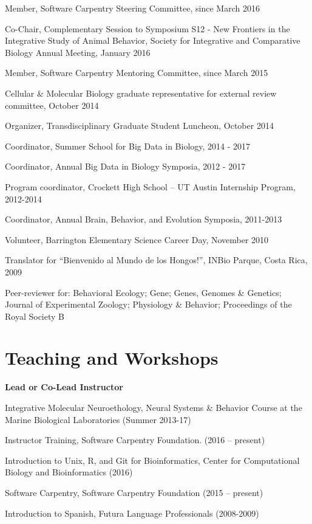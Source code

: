 \documentclass[margin,line]{resume}
\begin{document}
\begin{resume}
\begin{list1}
\item[] Member, Software Carpentry Steering Committee, since March 2016
\item[] Co-Chair, Complementary Session to Symposium S12 - New Frontiers in the Integrative Study of Animal Behavior, Society for Integrative and Comparative Biology Annual Meeting, January 2016
\item[] Member, Software Carpentry Mentoring Committee, since March 2015
\item[] Cellular \& Molecular Biology graduate representative for external review committee, October 2014 
\item[] Organizer, Transdisciplinary Graduate Student Luncheon, October 2014
\item[] Coordinator, Summer School for Big Data in Biology, 2014 - 2017
\item[] Coordinator, Annual Big Data in Biology Symposia, 2012 - 2017 
\item[] Program coordinator, Crockett High School – UT Austin Internship Program, 2012-2014
\item[] Coordinator, Annual Brain, Behavior, and Evolution Symposia, 2011-2013
\item[] Volunteer, Barrington Elementary Science Career Day, November 2010
\item[] Translator for “Bienvenido al Mundo de los Hongos!”, INBio Parque, Costa Rica, 2009
\item[] Peer-reviewer for: Behavioral Ecology; Gene; Genes, Genomes \& Genetics; Journal of Experimental Zoology; Physiology \& Behavior; Proceedings of the Royal Society B

\end{list1}

    
\section{\mysidestyle Teaching and Workshops}

{\bf Lead or Co-Lead Instructor }
\begin{list1}
\item[] Integrative Molecular Neuroethology, Neural Systems \& Behavior Course at the Marine Biological Laboratories (Summer 2013-17)
\item[] Instructor Training, Software Carpentry Foundation. (2016 – present)
\item[] Introduction to Unix, R, and Git for Bioinformatics, Center for Computational Biology and Bioinformatics (2016)
\item[] Software Carpentry, Software Carpentry Foundation (2015 – present)
\item[] Introduction to Spanish, Futura Language Professionals (2008-2009)
\end{list1}


\end{resume}
\end{document}
